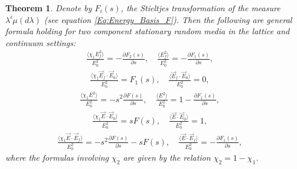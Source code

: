 \documentclass[english,12pt]{ttuthes}
\newtheorem{theorem}{Theorem}[chapter]
\begin{document}
% 
\begin{theorem}\label{thm:Herglotz_Decomp_Energy}
   Denote by $F_i(s)$, the Stieltjes transformation of the measure
   $\lambda^i\mu(d\lambda)$ (see equation \eqref{Eq:Energy_Basis_F}). Then the
   following are general formula holding for two component stationary  
   random media in the lattice and continuum settings: 
%
  \begin{align}\label{eq:Ed2_Energy_Partitions_Ef2}
  \frac{\langle\chi_1E_f^2\rangle}{E_0^2}=-\frac{\partial F_2(s)}{\partial s},   \quad
  \frac{\langle E_f^2\rangle}{E_0^2}=-\frac{\partial F_1(s)}{\partial s}, \quad
\end{align}  
%
  \begin{align}\label{eq:Ed2_Energy_Partitions_Ef*E0}
  \frac{ \langle\chi_1\vec{E}_f\cdot\vec{E}_0\rangle}{E_0^2}=F_1(s), \quad
  \frac{ \langle\vec{E}_f\cdot\vec{E}_0\rangle}{E_0^2}=0, \quad
  \end{align}
%
  \begin{align}\label{eq:Ed2_Energy_Partitions_E2}
   \frac{\langle\chi_1E^2\rangle}{E_0^2}=-s^2\frac{\partial F(s)}{\partial s}, \quad
   \frac{ \langle E^2\rangle}{E_0^2}=1-\frac{\partial F_1(s)}{\partial s}, \quad
  \end{align}
%
  \begin{align}\label{eq:Ed2_Energy_Partitions_E*E0}
    \frac{ \langle\chi_1\vec{E}\cdot\vec{E}_0\rangle}{E_0^2}=sF(s),\quad
    \frac{\langle\vec{E}\cdot\vec{E}_0\rangle}{E_0^2}=1,\quad
  \end{align}
%
  \begin{align}\label{eq:Ed2_Energy_Partitions_E*Ef}
    \frac{ \langle\chi_1\vec{E}\cdot\vec{E}_f\rangle}{E_0^2}=-s^2\frac{\partial F(s)}{\partial s}-sF(s),\quad
    \frac{\langle\vec{E}\cdot\vec{E}_f\rangle}{E_0^2}=-\frac{\partial F_1(s)}{\partial s},\quad
  \end{align}
%
  where the formulas involving $\chi_2$ are given by the relation $\chi_2=1-\chi_1$.
\end{theorem}
%
\end{document}

